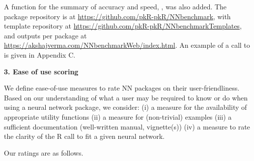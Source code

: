 A function for the summary of accuracy and speed, , was
also added. The package repository is at
\url{https://github.com/pkR-pkR/NNbenchmark}, with template repository
at \url{https://github.com/pkR-pkR/NNbenchmarkTemplates}, and outputs
per package at \url{https://akshajverma.com/NNbenchmarkWeb/index.html}.
An example of a call to  is given in Appendix
C.

\textbf{3. Ease of use scoring}

We define ease-of-use measures to rate NN packages on their
user-friendliness. Based on our understanding of what a user may be
required to know or do when using a neural network package, we consider:
(i) a measure for the availability of appropriate utility functions (ii)
a measure for (non-trivial) examples (iii) a sufficient documentation
(well-written manual, vignette(s)) (iv) a measure to rate the clarity of
the R call to fit a given neural network.

Our ratings are as follows.

